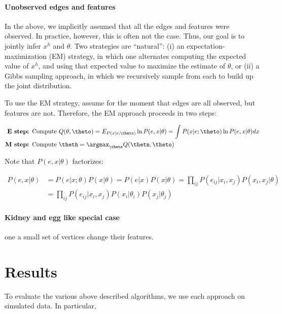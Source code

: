 \paragraph{Unobserved edges and features}

In the above, we implicitly assumed that all the edges and features were observed.  In practice, however, this is often not the case.  Thus, our goal is to jointly infer $x^h$ and $\theta$.  Two strategies are ``natural'': (i) an expectation-maximization (EM) strategy, in which one alternates computing the expected value of $x^h$, and using that expected value to maximize the estimate of $\theta$, or (ii) a Gibbs sampling approach, in which we recursively sample from each to build up the joint distribution.

To use the EM strategy, assume for the moment that edges are all observed, but features are not.  Therefore, the EM approach proceeds in two steps:

\begin{align*}
\textbf{E step: } \text{Compute } & Q(\theta,\theto) = E_{P(x | e; \theto)} \ln P(e,x | \theta) = \int P(x | e; \theto) \ln P(e,x | \theta) dx\\
\textbf{M step: } \text{Compute }& \theth = \argmax_{\thetn} Q(\thetn,\theto)
\end{align*}

Note that $P(e,x|\theta)$ factorizes:

\begin{align}
	P(e,x|\theta) &= P(e | x; \theta) P(x | \theta) = P(e|x) P(x|\theta) = \prod_{ij} P(e_{ij} | x_i,x_j) P(x_i, x_j | \theta) \nonumber \\ 
	&=  \prod_{ij} P(e_{ij} | x_i,x_j) P(x_i| \theta_i) P(x_j | \theta_j)
\end{align}

\paragraph{Kidney and egg like special case}

one a small set of vertices change their features.  


\section{Results}  %
\label{sec:results}

To evaluate the various above described algorithms, we use each approach on simulated data.  In particular, 

